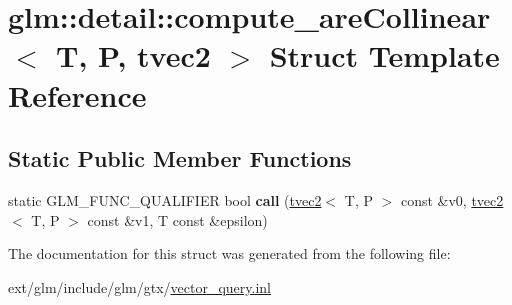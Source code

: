 \hypertarget{structglm_1_1detail_1_1compute__are_collinear_3_01_t_00_01_p_00_01tvec2_01_4}{\section{glm\-:\-:detail\-:\-:compute\-\_\-are\-Collinear$<$ T, P, tvec2 $>$ Struct Template Reference}
\label{structglm_1_1detail_1_1compute__are_collinear_3_01_t_00_01_p_00_01tvec2_01_4}
}
\subsection*{Static Public Member Functions}
\begin{DoxyCompactItemize}
\item 
\hypertarget{structglm_1_1detail_1_1compute__are_collinear_3_01_t_00_01_p_00_01tvec2_01_4_acec3b10a2cf7e270c961f64e8d68de5c}{static G\-L\-M\-\_\-\-F\-U\-N\-C\-\_\-\-Q\-U\-A\-L\-I\-F\-I\-E\-R bool {\bfseries call} (\hyperlink{structglm_1_1tvec2}{tvec2}$<$ T, P $>$ const \&v0, \hyperlink{structglm_1_1tvec2}{tvec2}$<$ T, P $>$ const \&v1, T const \&epsilon)}\label{structglm_1_1detail_1_1compute__are_collinear_3_01_t_00_01_p_00_01tvec2_01_4_acec3b10a2cf7e270c961f64e8d68de5c}

\end{DoxyCompactItemize}


The documentation for this struct was generated from the following file\-:\begin{DoxyCompactItemize}
\item 
ext/glm/include/glm/gtx/\hyperlink{vector__query_8inl}{vector\-\_\-query.\-inl}\end{DoxyCompactItemize}
